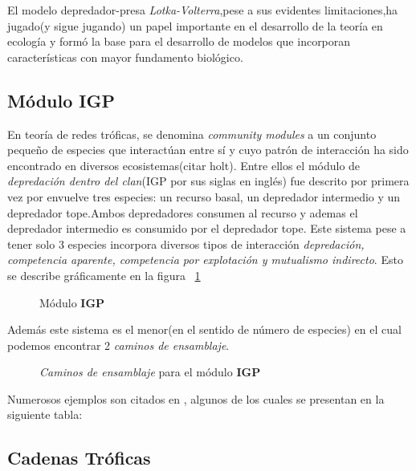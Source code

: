 El modelo depredador-presa \emph{Lotka-Volterra},pese a sus evidentes limitaciones,ha jugado(y sigue jugando) un papel importante en el desarrollo de la teor\'ia en ecolog\'ia y form\'o la base para el desarrollo de modelos que incorporan caracter\'isticas con mayor fundamento biol\'ogico.


\subsection{ M\'odulo IGP}

En teor\'ia de redes tr\'oficas, se denomina \emph{community modules} a un conjunto peque\~no de especies que interact\'uan entre s\'i y cuyo patr\'on de interacci\'on ha sido encontrado en diversos ecosistemas(citar holt). Entre ellos el m\'odulo de \emph{depredaci\'on dentro del clan}(IGP por sus siglas en ingl\'es) fue descrito por primera vez por \cite{polis1989ecology} envuelve tres especies: un recurso basal, un depredador intermedio y un depredador tope.Ambos depredadores consumen al recurso y ademas el depredador intermedio es consumido por el depredador tope. Este sistema pese a tener solo $3$ especies incorpora diversos tipos de interacci\'on \emph{depredaci\'on, competencia aparente, competencia por explotaci\'on y mutualismo indirecto}. Esto se describe gr\'aficamente en la figura ~\ref{fig:IGP}
\begin{figure}[h]

\caption{M\'odulo \textbf{IGP}}
\label{fig:IGP}
\end{figure}

Adem\'as este sistema es el menor(en el sentido de n\'umero de especies) en el cual podemos encontrar 2 \emph{caminos de ensamblaje}.
\begin{figure}[h]

\caption{\emph{Caminos de ensamblaje} para el m\'odulo \textbf{IGP}}
\label{fig:IGPAssembly}
\end{figure}
Numerosos ejemplos son citados en \cite{polis1989ecology}, algunos de los cuales se presentan en la siguiente tabla:


\subsection{Cadenas Tr\'oficas}


